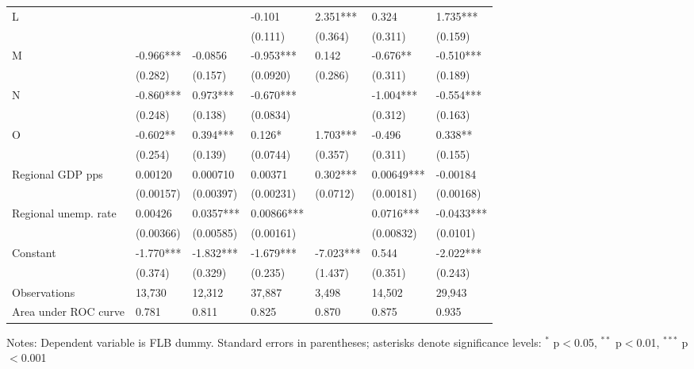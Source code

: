\documentclass[Review,times,sageh,11pt]{sagej}
\begin{document}
\begin{table}[thb]
{\begin{threeparttable}
\begin{tabular}{l*{6}{l}}
\quad L                   &            &           & -0.101     & 2.351***  & 0.324      & 1.735***   \\
                          &            &           & (0.111)    & (0.364)   & (0.311)    & (0.159)    \\[0.5ex]

\quad M                   &  -0.966*** & -0.0856   & -0.953***  & 0.142     & -0.676**   & -0.510***  \\
                          &  (0.282)   & (0.157)   & (0.0920)   & (0.286)   & (0.311)    & (0.189)    \\[0.5ex]

\quad N                   &  -0.860*** & 0.973***  & -0.670***  &           & -1.004***  & -0.554***  \\
                          &  (0.248)   & (0.138)   & (0.0834)   &           & (0.312)    & (0.163)    \\[0.5ex]

\quad O                   &  -0.602**  & 0.394***  & 0.126*     & 1.703***  & -0.496     & 0.338**    \\
                          &  (0.254)   & (0.139)   & (0.0744)   & (0.357)   & (0.311)    & (0.155)    \\[0.5ex]

Regional GDP pps          &  0.00120   & 0.000710  & 0.00371    & 0.302***  & 0.00649*** & -0.00184   \\
                          &  (0.00157) & (0.00397) & (0.00231)  & (0.0712)  & (0.00181)  & (0.00168)  \\[0.5ex]

Regional unemp. rate      &  0.00426   & 0.0357*** & 0.00866*** &           & 0.0716***  & -0.0433*** \\
                          &  (0.00366) & (0.00585) & (0.00161)  &           & (0.00832)  & (0.0101)   \\[0.5ex]

Constant                  &  -1.770*** & -1.832*** & -1.679***  & -7.023*** & 0.544      & -2.022***  \\
                          &  (0.374)   & (0.329)   & (0.235)    & (1.437)   & (0.351)    & (0.243)    \\
\midrule
Observations              &  13,730    & 12,312    & 37,887     & 3,498     & 14,502     & 29,943     \\
Area under ROC curve      &  0.781     & 0.811     & 0.825      & 0.870     & 0.875      & 0.935      \\
\bottomrule
\end{tabular}
\begin{tablenotes}
\item Notes: Dependent variable is FLB dummy. Standard errors in parentheses; asterisks denote significance levels: $^{*}$ p$<$0.05, $^{**}$ p$<$0.01, $^{***}$ p$<$0.001
\end{tablenotes}
\end{threeparttable}
} 
\end{table}
\end{document}
